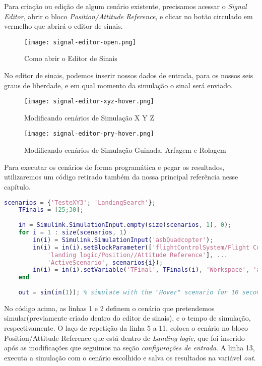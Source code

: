 Para criação ou edição de algum cenário existente, precisamos acessar o \textit{Signal Editor}, abrir o bloco \textit{Position/Attitude Reference}, e clicar no botão circulado em vermelho que abrirá o editor de sinais.


\begin{figure}[H]
	\centering
	\texttt{[image: signal-editor-open.png]}
	\caption{Como abrir o Editor de Sinais}
	\centering
	\label{sinal-editor-open}
\end{figure}

No editor de sinais, podemos inserir nossos dados de entrada, para os nossos seis graus de liberdade, e em qual momento da simulação o sinal será enviado.


\begin{figure}[H]
	\centering
	\texttt{[image: signal-editor-xyz-hover.png]}
	\caption{Modificando cenários de Simulação X Y Z}
	\centering
	\label{sinal-editor-xyz-hover}
\end{figure}

\begin{figure}[H]
	\centering
	\texttt{[image: signal-editor-pry-hover.png]}
	\caption{Modificando cenários de Simulação Guinada, Arfagem e Rolagem}
	\centering
	\label{signal-editor-pry-hover}
\end{figure}


Para executar os cenários de forma programática e pegar os resultados, utilizaremos um código retirado também da nossa principal referência nesse capítulo.

\begin{lstlisting}[language=Matlab, caption={Configuração de Cenários no MATLAB Simulink}]
	scenarios = {'TesteXY3'; 'LandingSearch'};
	TFinals = [25;30];
	
	in = Simulink.SimulationInput.empty(size(scenarios, 1), 0);
	for i = 1 : size(scenarios, 1)
		in(i) = Simulink.SimulationInput('asbQuadcopter');
		in(i) = in(i).setBlockParameter(['flightControlSystem/Flight Control System/' ...
			'landing logic/Position//Attitude Reference'], ...
			'ActiveScenario', scenarios{i});
		in(i) = in(i).setVariable('TFinal', TFinals(i), 'Workspace', 'asbQuadcopter');
	end
	
	out = sim(in(1)); % simulate with the "Hover" scenario for 10 seconds
\end{lstlisting}

No código acima, as linhas 1 e 2 definem o cenário que pretendemos simular(previamente criado dentro do editor de sinais), e o tempo de simulação, respectivamente. O laço de repetição da linha 5 a 11, coloca o cenário no bloco Position/Attitude Reference que está dentro de \textit{Landing logic}, que foi inserido após as modificações que seguimos na seção \textit{configuraçôes de entrada}. A linha 13, executa a simulação com o cenário escolhido e salva os resultados na variável \textit{out}.


